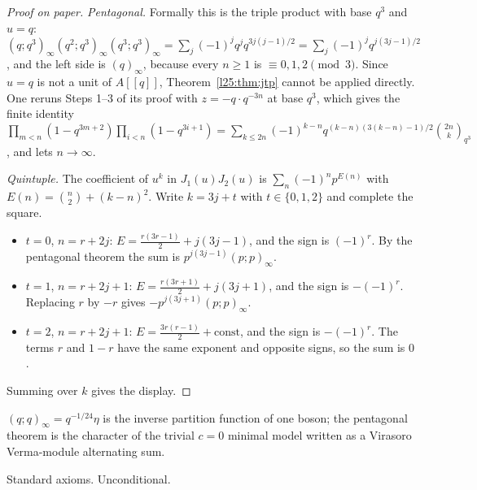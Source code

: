 \begin{proof}[Proof on paper]
\emph{Pentagonal.} Formally this is the triple product with base $q^3$ and $u=q$:
$(q;q^3)_\infty(q^2;q^3)_\infty(q^3;q^3)_\infty=\sum_j(-1)^jq^{j}q^{3j(j-1)/2}=\sum_j(-1)^jq^{j(3j-1)/2}$, and the left side
is $(q)_\infty$, because every $n\ge1$ is $\equiv0,1,2\pmod3$. Since $u=q$ is not a unit of $A[[q]]$,
Theorem~\ref{l25:thm:jtp} cannot be applied directly. One reruns Steps 1--3 of its proof with $z=-q\cdot q^{-3n}$ at
base $q^3$, which gives the finite identity
$\prod_{m<n}(1-q^{3m+2})\prod_{i<n}(1-q^{3i+1})=\sum_{k\le2n}(-1)^{k-n}q^{(k-n)(3(k-n)-1)/2}\binom{2n}{k}_{q^3}$, and lets
$n\to\infty$.

\emph{Quintuple.} The coefficient of $u^k$ in $J_1(u)J_2(u)$ is $\sum_{n}(-1)^np^{E(n)}$ with
$E(n)=\binom n2+(k-n)^2$. Write $k=3j+t$ with $t\in\{0,1,2\}$ and complete the square.
\begin{itemize}
\item $t=0$, $n=r+2j$: $E=\frac{r(3r-1)}2+j(3j-1)$, and the sign is $(-1)^r$. By the pentagonal theorem the sum is
  $p^{j(3j-1)}(p;p)_\infty$.
\item $t=1$, $n=r+2j+1$: $E=\frac{r(3r+1)}2+j(3j+1)$, and the sign is $-(-1)^r$. Replacing $r$ by $-r$ gives
  $-p^{j(3j+1)}(p;p)_\infty$.
\item $t=2$, $n=r+2j+1$: $E=\frac{3r(r-1)}2+\text{const}$, and the sign is $-(-1)^r$. The terms $r$ and $1-r$ have the
  same exponent and opposite signs, so the sum is $0$.
\end{itemize}
Summing over $k$ gives the display.
\end{proof}
\begin{physics}
$(q;q)_\infty=q^{-1/24}\eta$ is the inverse partition function of one boson; the pentagonal theorem is the
character of the trivial $c=0$ minimal model written as a Virasoro Verma-module alternating sum.
\end{physics}
\begin{status}
Standard axioms. Unconditional.
\end{status}

